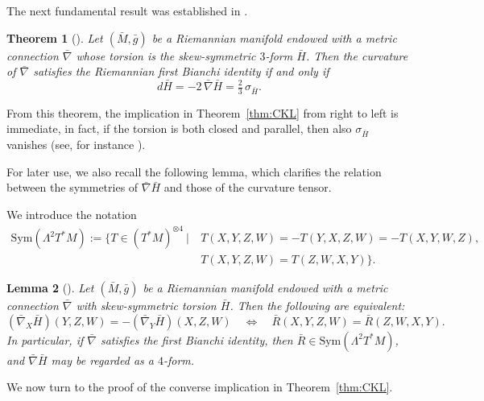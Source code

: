 \documentclass{article}
\newtheorem{thm}{Theorem}[section]
\newtheorem{lem}[thm]{Lemma}
\theoremstyle{definition}
\numberwithin{equation}{section}
\begin{document}
The next fundamental result was established in \cite{IS}.

\begin{thm}[\cite{IS}] \label{thm:IS}
Let \((\bar{M}, \bar{g})\) be a Riemannian manifold endowed with a metric connection \(\bar{\nabla}\) whose torsion is the skew-symmetric \(3\)-form \(\bar{H}\).  
Then the curvature of \(\bar{\nabla}\) satisfies the Riemannian first Bianchi identity if and only if
\begin{equation} \label{eqn:IS}
    d\bar{H} = -2\, \bar{\nabla}\bar{H} = \tfrac{2}{3}\, \sigma_{\bar{H}}.
\end{equation}
\end{thm}

From this theorem, the implication in Theorem~\ref{thm:CKL} from right to left is immediate, in fact, if the torsion is both closed and parallel, then also $\sigma_{\bar{H}}$ vanishes (see, for instance \cite[ Equation (2.4)]{IS}). \par  
For later use, we also recall the following lemma, which clarifies the relation between the symmetries of \(\bar{\nabla}\bar{H}\) and those of the curvature tensor.

\medskip

We introduce the notation
\[
\begin{split}
\mathrm{Sym}\!\left(\Lambda^2 T^*M\right) := \Big\{
T \in (T^*M)^{\otimes 4} \ \Big| \ 
&T(X,Y,Z,W) = -T(Y,X,Z,W) = -T(X,Y,W,Z),\\
&T(X,Y,Z,W) = T(Z,W,X,Y)
\Big\}.
\end{split}
\]

\begin{lem}[\cite{Iv}] \label{lem:symm2}
Let \((\bar{M}, \bar{g})\) be a Riemannian manifold endowed with a metric connection \(\bar{\nabla}\) with skew-symmetric torsion \(\bar{H}\).  
Then the following are equivalent:
\[
(\bar{\nabla}_X \bar{H})(Y,Z,W) = -(\bar{\nabla}_Y \bar{H})(X,Z,W)
    \quad\Longleftrightarrow\quad
    \bar{R}(X,Y,Z,W) = \bar{R}(Z,W,X,Y).
\]
In particular, if \(\bar{\nabla}\) satisfies the first Bianchi identity, then \(\bar{R} \in \mathrm{Sym}\!\left(\Lambda^2 T^*M\right)\), and \(\bar{\nabla}\bar{H}\) may be regarded as a \(4\)-form.
\end{lem}

\medskip

We now turn to the proof of the converse implication in Theorem~\ref{thm:CKL}.
\end{document}
